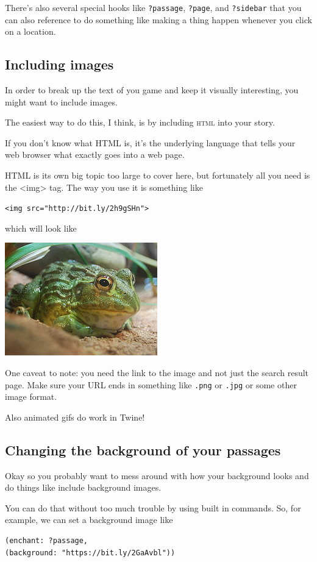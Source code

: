\documentclass[a5paper,11pt]{article}
\begin{document}
There's also several special hooks like \verb"?passage", \verb"?page", and \verb"?sidebar" that you can also reference to do something like making a thing happen whenever you click on a location.

\subsection{Including images}
In order to break up the text of you game and keep it visually interesting, you might want to include images.

The easiest way to do this, I think, is by including \textsc{html} into your story.

If you don't know what HTML is, it's the underlying language that tells your web browser what exactly goes into a web page.

HTML is its own big topic too large to cover here, but fortunately all you need is the <img> tag. The way you use it is something like

\verb|<img src="http://bit.ly/2h9gSHn">|

which will look like

\includegraphics{froggy}

One caveat to note: you need the link to the image and not just the search result page. Make sure your URL ends in something like \verb".png" or \verb".jpg" or some other image format.

Also animated gifs do work in Twine!
\subsection{Changing the background of your passages}
Okay so you probably want to mess around with how your background looks and do things like include background images.

You can do that without too much trouble by using built in commands. So, for example, we can set a background image like
\begin{verbatim}
(enchant: ?passage, 
(background: "https://bit.ly/2GaAvbl"))
\end{verbatim}
\end{document}
